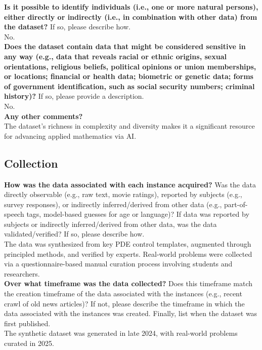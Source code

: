     \textcolor{\sectioncolor}{\textbf{Is it possible to identify individuals (i.e., one or more natural persons),
    either directly or indirectly (i.e., in combination with other data) from
    the dataset?
    }
    If so, please describe how.
    } \\
    No. \\
    
    \textcolor{\sectioncolor}{\textbf{Does the dataset contain data that might be considered sensitive in any way
    (e.g., data that reveals racial or ethnic origins, sexual orientations,
    religious beliefs, political opinions or union memberships, or locations;
    financial or health data; biometric or genetic data; forms of government
    identification, such as social security numbers; criminal history)?
    }
    If so, please provide a description.
    } \\
    No. \\
    
    \textcolor{\sectioncolor}{\textbf{Any other comments?
    }} \\
    The dataset’s richness in complexity and diversity makes it a significant resource for advancing applied mathematics via AI. \\

\subsection{Collection}

    \textcolor{\sectioncolor}{\textbf{How was the data associated with each instance acquired?
    }
    Was the data directly observable (e.g., raw text, movie ratings),
    reported by subjects (e.g., survey responses), or indirectly
    inferred/derived from other data (e.g., part-of-speech tags, model-based
    guesses for age or language)? If data was reported by subjects or
    indirectly inferred/derived from other data, was the data
    validated/verified? If so, please describe how.
    } \\
    The data was synthesized from key PDE control templates, augmented through principled methods, and verified by experts. Real-world problems were collected via a questionnaire-based manual curation process involving students and researchers. \\
    
    \textcolor{\sectioncolor}{\textbf{Over what timeframe was the data collected?
    }
    Does this timeframe match the creation timeframe of the data associated
    with the instances (e.g., recent crawl of old news articles)? If not,
    please describe the timeframe in which the data associated with the
    instances was created. Finally, list when the dataset was first published.
    } \\
    The synthetic dataset was generated in late 2024, with real-world problems curated in 2025. \\
    
